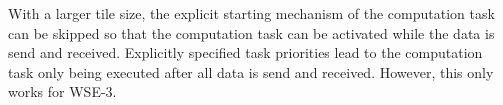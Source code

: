 \documentclass{article}
\begin{document}
With a larger tile size, the explicit starting mechanism of the computation task can be skipped so that the computation task can be activated while the data is send and received. Explicitly specified task priorities lead to the computation task only being executed after all data is send and received. However, this only works for WSE-3.




        
        
        
\end{document}
